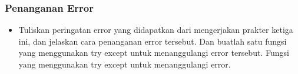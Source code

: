 \subsubsection{Penanganan Error} 
\begin{itemize}
  \item Tuliskan peringatan error yang didapatkan dari mengerjakan prakter ketiga ini, dan jelaskan cara penanganan error tersebut. Dan buatlah satu fungsi yang menggunakan try except untuk menanggulangi error tersebut.
      Fungsi yang menggunakan try except untuk menanggulangi error.


\end{itemize}